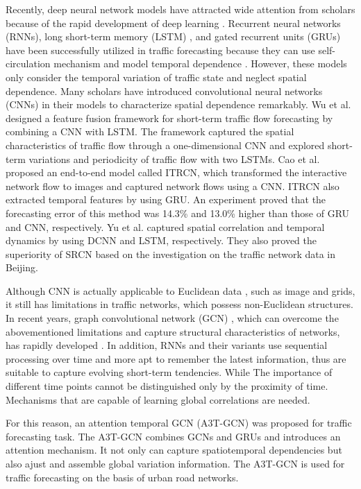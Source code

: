 \documentclass[10pt,journal,compsoc]{IEEEtran}
\begin{document}
\par Recently, deep neural network models have attracted wide attention from scholars because of the rapid development of deep learning \cite{Silver2017Mastering,Morav2017DeepStack}. Recurrent neural networks (RNNs), long short-term memory (LSTM) \cite{Graves1997Long}, and gated recurrent units (GRUs)\cite{Cho2014On} have been successfully utilized in traffic forecasting because they can use self-circulation mechanism and model temporal dependence \cite{Rui2016Using,Lint2002Freeway}. However, these models only consider the temporal variation of traffic state and neglect spatial dependence. Many scholars have introduced convolutional neural networks (CNNs) in their models to characterize spatial dependence remarkably. Wu et al. \cite{Wu2016Short} designed a feature fusion framework for short-term traffic flow forecasting by combining a CNN with LSTM. The framework captured the spatial characteristics of traffic flow through a one-dimensional CNN and explored short-term variations and periodicity of traffic flow with two LSTMs. Cao et al. \cite{Cao2017Interactive} proposed an end-to-end model called ITRCN, which transformed the interactive network flow to images and captured network flows using a CNN. ITRCN also extracted temporal features by using GRU. An experiment proved that the forecasting error of this method was 14.3\% and 13.0\% higher than those of GRU and CNN, respectively. Yu et al. \cite{Yu2017Spatiotemporal} captured spatial correlation and temporal dynamics by using DCNN and LSTM, respectively. They also proved the superiority of SRCN based on the investigation on the traffic network data in Beijing.
\par Although CNN is actually applicable to Euclidean data \cite{defferrard2016convolutional}, such as image and grids, it still has limitations in traffic networks, which possess non-Euclidean structures. In recent years, graph convolutional network (GCN) \cite{kipf2016semisupervised}, which can overcome the abovementioned limitations and capture structural characteristics of networks, has rapidly developed \cite{DBLP:journals/corr/LiYSL17, zhao2019t, yu2020forecasting}. In addition, RNNs and their variants use sequential processing over time and more apt to remember the latest information, thus are suitable to capture evolving short-term tendencies. While The importance of different time points cannot be distinguished only by the proximity of time. Mechanisms that are capable of learning global correlations are needed.
\par For this reason, an attention temporal GCN (A3T-GCN) was proposed for traffic forecasting task. The A3T-GCN combines GCNs and GRUs and introduces an attention mechanism\cite{xu2015attend, vaswani2017attention}. It not only can capture spatiotemporal dependencies but also ajust and assemble global variation information. The A3T-GCN is used for traffic forecasting on the basis of urban road networks.
\end{document}
